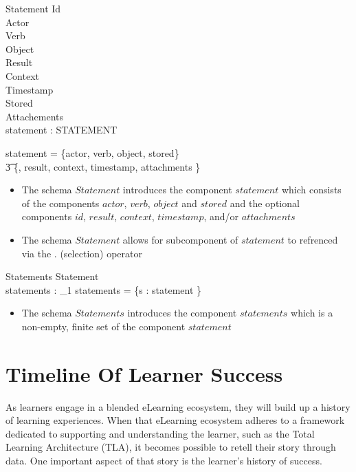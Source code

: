 \documentclass{article}
\begin{document}
\begin{schema}{Statement}
  Id \\
  Actor \\
  Verb \\
  Object \\
  Result \\
  Context \\
  Timestamp \\
  Stored \\
  Attachements \\
  statement : STATEMENT

  \where
  statement = \{actor, verb, object, stored\} \cup \\\t3 \power \{\id,
  result, context, timestamp, attachments \} \\
\end{schema}
\begin{itemize}
\item The schema $Statement$ introduces the component $statement$
  which consists of the components $actor$, $verb$, $object$ and
  $stored$ and the optional components $id$, $result$, $context$,
  $timestamp$, and/or $attachments$
\item The schema $Statement$ allows for subcomponent of $statement$
  to refrenced via the $.$ (selection) operator
\end{itemize}

\begin{schema}{Statements}
  Statement \\
  statements : \finset_1
  \where
  statements = \{s : statement \}
\end{schema}
\begin{itemize}
\item The schema $Statements$ introduces the component $statements$
  which is a non-empty, finite set of the component $statement$
\end{itemize}

\section{Timeline Of Learner Success}
As learners engage in a blended eLearning ecosystem, they will build
up a history of learning experiences. When that eLearning ecosystem
adheres to a framework dedicated to supporting and understanding the
learner, such as the Total Learning Architecture (TLA), it becomes
possible to retell their story through data. One important aspect of
that story is the learner's history of success.
\end{document}
